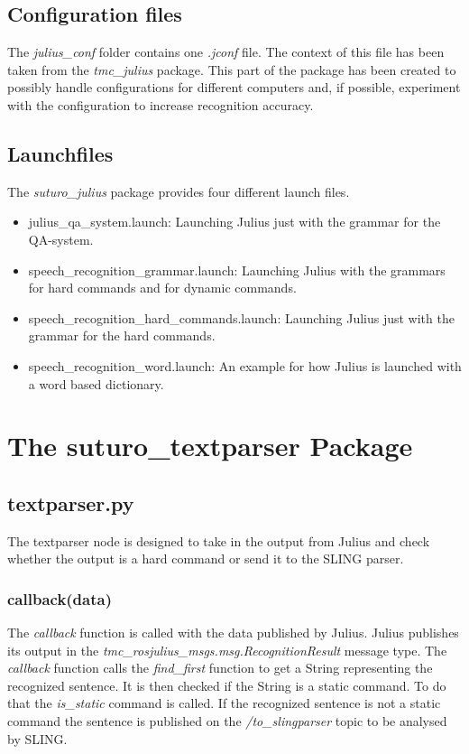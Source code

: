\documentclass[main.tex]{subfiles}
\begin{document}
    \subsection{Configuration files}
        The \textit{julius\_conf} folder contains one \textit{.jconf} file. The context of this file has been taken from the \textit{tmc\_julius} package. This part of the package has been created to possibly handle configurations for different computers and, if possible, experiment with the configuration to increase recognition accuracy.
    \subsection{Launchfiles}
        The \textit{suturo\_julius} package provides four different launch files.\\
        \begin{itemize}
            \item julius\_qa\_system.launch:
            \subitem Launching Julius just with the grammar for the QA-system.
            \item speech\_recognition\_grammar.launch:
            \subitem Launching Julius with the grammars for hard commands and for dynamic commands.
            \item speech\_recognition\_hard\_commands.launch:
            \subitem Launching Julius just with the grammar for the hard commands.
            \item speech\_recognition\_word.launch:
            \subitem An example for how Julius is launched with a word based dictionary.
        \end{itemize}

\section{The suturo\_textparser Package}
    \subsection{textparser.py}
        The textparser node is designed to take in the output from Julius and check whether the output is a hard command or send it to the SLING parser.
        \subsubsection{callback(data)}
            The \textit{callback} function is called with the data published by Julius. Julius publishes its output in the \textit{tmc\_rosjulius\_msgs.msg.RecognitionResult} message type. The \textit{callback} function calls the \textit{find\_first} function to get a String representing the recognized sentence. It is then checked if the String is a static command. To do that the \textit{is\_static} command is called. If the recognized sentence is not a static command the sentence is published on the \textit{/to\_slingparser} topic to be analysed by SLING.
    
\end{document}
